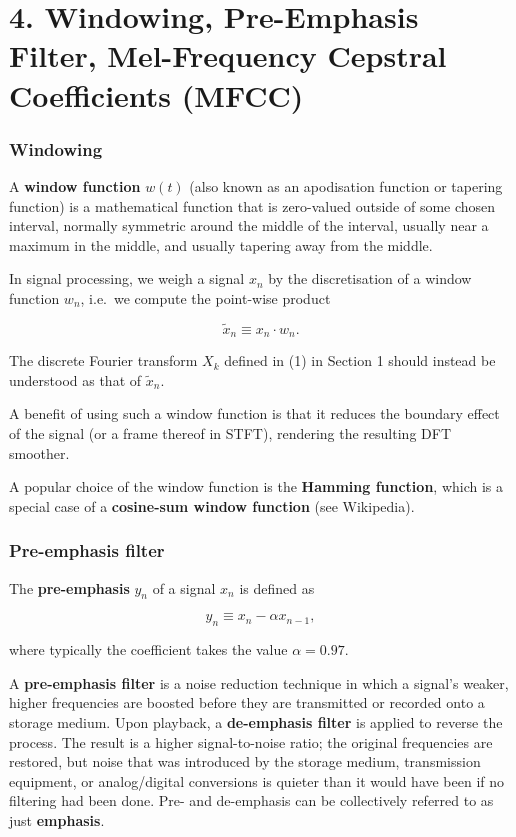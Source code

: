 \documentclass[11pt]{article}
\begin{document}
    \hypertarget{windowing-pre-emphasis-filter-mel-frequency-cepstral-coefficients-mfcc}{%
\section{4. Windowing, Pre-Emphasis Filter, Mel-Frequency Cepstral Coefficients (MFCC)}\label{windowing-pre-emphasis-filter-mel-frequency-cepstral-coefficients-mfcc}}

\hypertarget{windowing}{%
\subsubsection{Windowing}\label{windowing}}

A \textbf{window function} \(w(t)\) (also known as an apodisation
function or tapering function) is a mathematical function that is
zero-valued outside of some chosen interval, normally symmetric around
the middle of the interval, usually near a maximum in the middle, and
usually tapering away from the middle.

In signal processing, we weigh a signal \(x_n\) by the discretisation of
a window function \(w_n\), i.e.~we compute the point-wise product

\[\tilde{x}_n\equiv x_n \cdot w_n. \tag{8}\]

The discrete Fourier transform \(X_k\) defined in (1) in Section 1
should instead be understood as that of \(\tilde{x}_n\).

A benefit of using such a window function is that it reduces the
boundary effect of the signal (or a frame thereof in STFT), rendering
the resulting DFT smoother.

A popular choice of the window function is the \textbf{Hamming
function}, which is a special case of a \textbf{cosine-sum window
function} (see Wikipedia).

\hypertarget{pre-emphasis-filter}{%
\subsubsection{Pre-emphasis filter}\label{pre-emphasis-filter}}

The \textbf{pre-emphasis} \(y_n\) of a signal \(x_n\) is defined as

\[ y_n \equiv x_n - \alpha x_{n-1},\tag{9}\]

where typically the coefficient takes the value \(\alpha=0.97\).

A \textbf{pre-emphasis filter} is a noise reduction technique in which a
signal's weaker, higher frequencies are boosted before they are
transmitted or recorded onto a storage medium. Upon playback, a
\textbf{de-emphasis filter} is applied to reverse the process. The
result is a higher signal-to-noise ratio; the original frequencies are
restored, but noise that was introduced by the storage medium,
transmission equipment, or analog/digital conversions is quieter than it
would have been if no filtering had been done. Pre- and de-emphasis can
be collectively referred to as just \textbf{emphasis}.
\end{document}
